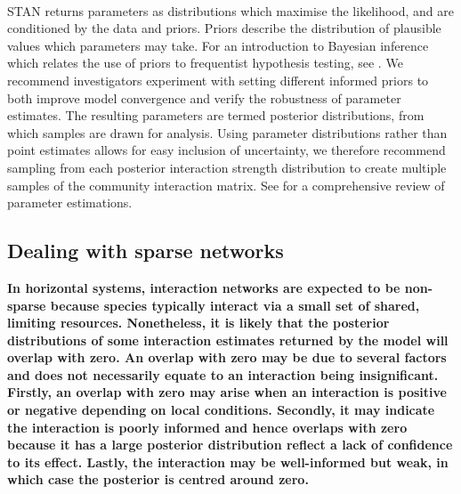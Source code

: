 \documentclass[a4,12pt]{article}
\begin{document}
\begin{refsection}
        \paragraph{}
        STAN returns parameters as distributions which maximise the likelihood, and are conditioned by the data and priors. Priors describe the distribution of plausible values which parameters may take. For an introduction to Bayesian inference which relates the use of priors to frequentist hypothesis testing, see \textcite{Ellison1996}. We recommend investigators experiment with setting different informed priors to both improve model convergence and verify the robustness of parameter estimates. The resulting parameters are termed posterior distributions, from which samples are drawn for analysis. Using parameter distributions rather than point estimates allows for easy inclusion of uncertainty, we therefore recommend sampling from each posterior interaction strength distribution to create multiple samples of the community interaction matrix. See \textcite{Ellison2004} for a comprehensive review of parameter estimations.

    \subsection{Dealing with sparse networks}
    \label{meth:sparse}

    \textbf{In horizontal systems, interaction networks are expected to be non-sparse because species typically interact via a small set of shared, limiting resources. Nonetheless, it is likely that the posterior distributions of some interaction estimates returned by the model will overlap with zero. An overlap with zero may be due to several factors and does not necessarily equate to an interaction being insignificant. Firstly, an overlap with zero may arise when an interaction is positive or negative depending on local conditions. Secondly, it may indicate the interaction is poorly informed and hence overlaps with zero because it has a large posterior distribution reflect a lack of confidence to its effect. Lastly, the interaction may be well-informed but weak, in which case the posterior is centred around zero.}


\end{refsection}
\end{document}
